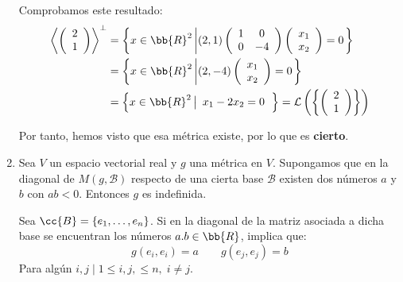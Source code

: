 \begin{ejercicio}
\begin{enumerate}
        Comprobamos este resultado:
        \begin{equation*}\begin{split}
            \left<\left( \begin{array}{c}
           2 \\ 1
        \end{array}\right)\right>^\perp & = \left\{x\in \bb{R}^2 \left|
            (2,1)\left( \begin{array}{cc}
                1 & 0 \\
                0 & -4 \\
            \end{array}\right)
            \left( \begin{array}{c}
                x_1 \\ x_2
            \end{array}\right)
            = 0
            \right.\right\}\\
            & = \left\{x\in \bb{R}^2 \left|
            (2,-4)
            \left( \begin{array}{c}
                x_1 \\ x_2
            \end{array}\right)
            = 0
            \right.\right\} \\
            &= \left\{x\in \bb{R}^2 \left|
            \begin{array}{c}
                x_1 -2 x_2= 0
            \end{array}
            \right.\right\} = \mathcal{L} \left( \left\{ \left(
            \begin{array}{c}
                2 \\ 1
            \end{array}
            \right) \right\}\right)
        \end{split}\end{equation*}

        Por tanto, hemos visto que esa métrica existe, por lo que es \textbf{cierto}.
        

        \item Sea $V$ un espacio vectorial real y $g$ una métrica en $V$. Supongamos que en la diagonal de $M(g,\mathcal{B})$ respecto de una cierta base $\mathcal{B}$ existen dos números $a$ y $b$ con $ab < 0$. Entonces $g$ es indefinida.

        Sea $\cc{B}=\{e_1, \dots, e_n\}$. Si en la diagonal de la matriz asociada a dicha base se encuentran los números $a.b\in \bb{R}$, implica que:
        \begin{equation*}
            g(e_i, e_i) = a \qquad g(e_j, e_j) = b
        \end{equation*}
        Para algún $i,j \mid 1\leq i,j,\leq n,\; i\neq j$.


\end{enumerate}
\end{ejercicio}
